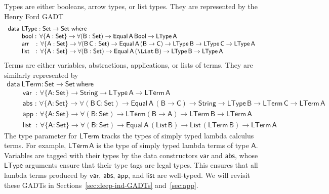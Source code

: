 \documentclass[9pt]{entcs}
\begin{document}
Types are either booleans, arrow types, or list types. They are
represented by the Henry Ford GADT
\begin{equation}\label{eq:eq_ltype}
\begin{array}{l}
\mathsf{data\ LType : Set \to Set\ where}\\
\mathsf{\;\;\;\;\;\;\;\;bool :\, \forall \{A : Set\} \to \forall (B : Set) \to Equal\,A\,Bool
  \to LType\,A}\\ 
\mathsf{\;\;\;\;\;\;\;\;arr\;\;\; :\, \forall \{A : Set\} \to \forall (B\,C : Set) \to
  Equal\,A\,(B \to C) \to LType\,B \to LType\,C \to LType\,A}\\ 
  \mathsf{\;\;\;\;\;\;\;\;list\,\;\; :\,  \forall \{A : Set\} \to\forall (B : Set) \to
    Equal\,A\,(\List\,B) \to LType\,B \to LType\,A} 
\end{array}
\end{equation}
Terms are either variables, abstractions, applications, or lists of
terms. They are similarly represented by
\begin{equation}\label{eq:eq_lterm}
\begin{array}{l}
\mathsf{data\ LTerm : Set \to Set\ where}\\
\mathsf{\;\;\;\;\;\;\;\;var\,\,\,:\,  \forall \{A : Set\} \to String \to LType\,A \to
  LTerm\,A} \\  
\mathsf{\;\;\;\;\;\;\;\;abs\,\, :\,  \forall \{A : Set\} \to \forall (B\,C : Set) \to
  Equal\,A\,(B \to C) \to String \to LType\,B \to LTerm\,C \to
  LTerm\,A}\\ 
  \mathsf{\;\;\;\;\;\;\;\;app\; :\,  \forall \{A : Set\} \to \forall (B : Set) \to
    LTerm (B \to A) \to LTerm\,B \to LTerm\,A} \\ 
  \mathsf{\;\;\;\;\;\;\;\;list\;\,\, :\,  \forall \{A : Set\} \to \forall (B : Set) \to
    Equal\,A\,(List\,B) \to List\,(LTerm\,B) \to LTerm\,A} 
\end{array}
\end{equation}
The type parameter for $\mathsf{LTerm}$ tracks the types of simply
typed lambda calculus terms. For example, $\mathsf{LTerm\,A}$ is the
type of simply typed lambda terms of type $\mathsf{A}$. Variables are
tagged with their types by the data constructors $\mathsf{var}$ and
$\mathsf{abs}$, whose $\mathsf{LType}$ arguments ensure that their
type tags are legal types. This ensures that all lambda terms
produced by $\mathsf{var}$, $\mathsf{abs}$, $\mathsf{app}$, and
$\mathsf{list}$ are well-typed.  We will revisit these GADTs in
Sections~\ref{sec:deep-ind-GADTs} and~\ref{sec:app}.
\end{document}
